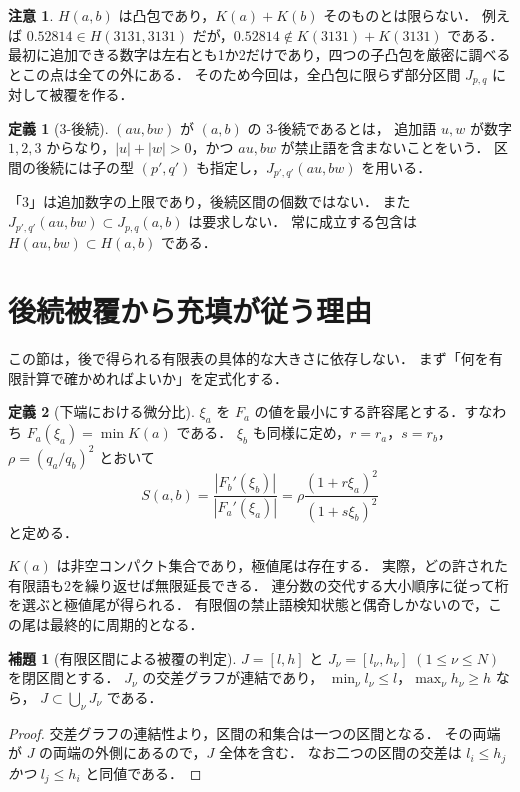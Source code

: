\documentclass[10pt,a4paper]{article}
\theoremstyle{definition}
\newtheorem{definition}{定義}
\newtheorem{lemma}{補題}
\newtheorem{remark}{注意}
\begin{document}
\begin{remark}\label{rem:hull}
$H(a,b)$ は凸包であり，$K(a)+K(b)$ そのものとは限らない．
例えば $0.52814\in H(3131,3131)$ だが，$0.52814\notin K(3131)+K(3131)$ である．
最初に追加できる数字は左右とも1か2だけであり，四つの子凸包を厳密に調べるとこの点は全ての外にある．
そのため今回は，全凸包に限らず部分区間 $J_{p,q}$ に対して被覆を作る．
\end{remark}

\begin{definition}[$3$-後続]
$(au,bw)$ が $(a,b)$ の $3$-後続であるとは，
追加語 $u,w$ が数字 $1,2,3$ からなり，$|u|+|w|>0$，かつ $au,bw$ が禁止語を含まないことをいう．
区間の後続には子の型 $(p',q')$ も指定し，$J_{p',q'}(au,bw)$ を用いる．
\end{definition}

「3」は追加数字の上限であり，後続区間の個数ではない．
また $J_{p',q'}(au,bw)\subset J_{p,q}(a,b)$ は要求しない．
常に成立する包含は $H(au,bw)\subset H(a,b)$ である．

\section{後続被覆から充填が従う理由}\label{sec:iteration}
この節は，後で得られる有限表の具体的な大きさに依存しない．
まず「何を有限計算で確かめればよいか」を定式化する．

\begin{definition}[下端における微分比]\label{def:S}
$\xi_a$ を $F_a$ の値を最小にする許容尾とする．すなわち $F_a(\xi_a)=\min K(a)$ である．
$\xi_b$ も同様に定め，$r=r_a$，$s=r_b$，$\rho=(q_a/q_b)^2$ とおいて
\[
 S(a,b)=\frac{|F_b'(\xi_b)|}{|F_a'(\xi_a)|}
       =\rho\frac{(1+r\xi_a)^2}{(1+s\xi_b)^2}
\]
と定める．
\end{definition}

$K(a)$ は非空コンパクト集合であり，極値尾は存在する．
実際，どの許された有限語も2を繰り返せば無限延長できる．
連分数の交代する大小順序に従って桁を選ぶと極値尾が得られる．
有限個の禁止語検知状態と偶奇しかないので，この尾は最終的に周期的となる．

\begin{lemma}[有限区間による被覆の判定]\label{lem:cover}
$J=[l,h]$ と $J_\nu=[l_\nu,h_\nu]$ $(1\le\nu\le N)$ を閉区間とする．
$J_\nu$ の交差グラフが連結であり，
$\min_\nu l_\nu\le l$，$\max_\nu h_\nu\ge h$ なら，
$J\subset\bigcup_\nu J_\nu$ である．
\end{lemma}
\begin{proof}
交差グラフの連結性より，区間の和集合は一つの区間となる．
その両端が $J$ の両端の外側にあるので，$J$ 全体を含む．
なお二つの区間の交差は $l_i\le h_j$ \emph{かつ} $l_j\le h_i$ と同値である．
\end{proof}
\end{document}
